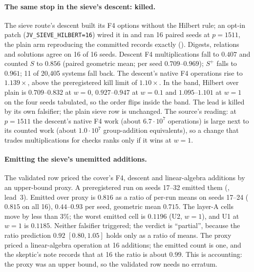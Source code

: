\paragraph{The same stop in the sieve's descent: killed.} The sieve route's
descent built its F4 options without the Hilbert rule; an opt-in patch
(\texttt{JV\_SIEVE\_HILBERT=16}) wired it in and ran 16 paired seeds at
$p=1511$, the plain arm reproducing the committed records exactly
(). Digests,
relations and solutions agree on 16 of 16 seeds. Descent F4
multiplications fall to $0.407$ and counted $S$ to $0.856$ (paired
geometric mean; per seed $0.709$--$0.969$); $S^+$ falls to $0.961$; 11
of 20{,}405 systems fall back. The descent's native F4 operations rise to
$1.139\times$, above the preregistered kill limit of $1.10\times$. In the
band, Hilbert over plain is $0.709$--$0.832$ at $w=0$, $0.927$--$0.947$ at
$w=0.1$ and $1.095$--$1.101$ at $w=1$ on the four seeds tabulated, so the
order flips inside the band. The lead is killed by its own falsifier; the
plain sieve row is unchanged. The source's reading: at $p=1511$ the
descent's native F4 work (about $6.7\cdot10^7$ operations) is large next
to its counted work (about $1.0\cdot10^7$ group-addition equivalents), so a
change that trades multiplications for checks ranks only if it wins at
$w=1$.

\paragraph{Emitting the sieve's unemitted additions.} The validated row
priced the cover's F4, descent and linear-algebra additions by an upper-bound
proxy. A preregistered run on seeds 17--32 emitted them
(, lead~3).
Emitted over proxy is $0.816$ as a ratio of per-run means on seeds
17--24 ($0.815$ on all 16), $0.44$--$0.93$ per seed, geometric mean
$0.715$. The layer-A cells move by less than 3\%; the worst emitted cell is
$0.1196$ (U2, $w=1$), and U1 at $w=1$ is $0.1185$. Neither falsifier
triggered; the verdict is ``partial'', because the ratio prediction
$0.92$ $[0.80,1.05]$ holds only as a ratio of means. The proxy priced a
linear-algebra operation at 16 additions; the emitted count is one, and the
skeptic's note records that at 16 the ratio is about $0.99$. This is
accounting: the proxy was an upper bound, so the validated row needs no
erratum.


